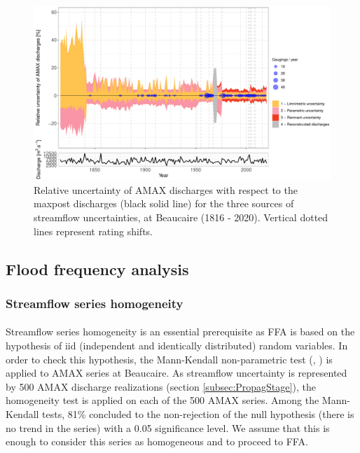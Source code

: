 \documentclass[11pt]{article}
\begin{document}
    \begin{figure}[h!]
        \centering
        \includegraphics[width=\textwidth]{Figs/9-IcAndAMAX.pdf}
        \caption{Relative uncertainty of AMAX discharges with respect to the maxpost discharges (black solid line) for the three sources of streamflow uncertainties, at Beaucaire (1816 - 2020). Vertical dotted lines represent rating shifts.}
        \label{fig:ICtot_both}
    \end{figure}
    
   
    \subsection{Flood frequency analysis}
    
        \subsubsection{Streamflow series homogeneity}
           
        \paragraph{}
        Streamflow series homogeneity is an essential prerequisite as FFA is based on the hypothesis of iid (independent and identically distributed) random variables. In order to check this hypothesis, the Mann-Kendall non-parametric test (\citet{mann_nonparametric_1945}, \citet{kendall_rank_1948}) is applied to AMAX series at Beaucaire. As streamflow uncertainty is represented by 500 AMAX discharge realizations (section \ref{subsec:PropagStage}), the homogeneity test is applied on each of the 500 AMAX series. Among the Mann-Kendall tests, 81\% concluded to the non-rejection of the null hypothesis (there is no trend in the series) with a 0.05 significance level. We assume that this is enough to consider this series as homogeneous and to proceed to FFA. 
        
\end{document}
